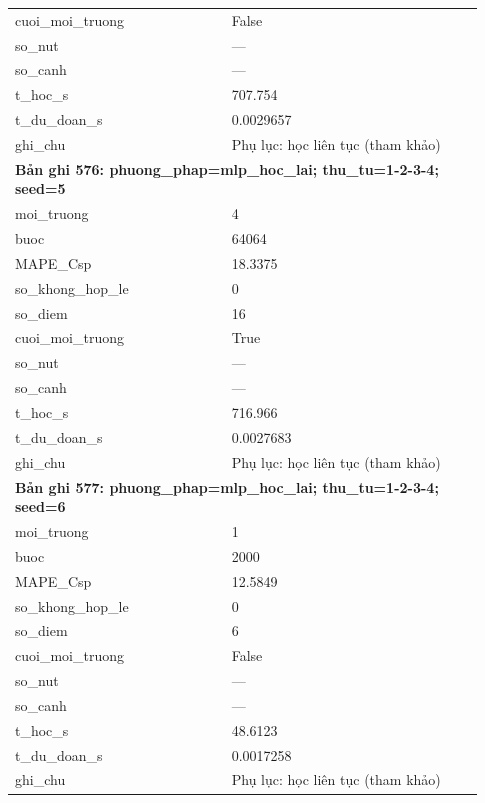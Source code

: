 \begin{longtable}{p{0.43\linewidth}p{0.50\linewidth}}
cuoi\_\allowbreak moi\_\allowbreak truong & False \\
so\_\allowbreak nut & — \\
so\_\allowbreak canh & — \\
t\_\allowbreak hoc\_\allowbreak s & 707.754 \\
t\_\allowbreak du\_\allowbreak doan\_\allowbreak s & 0.0029657 \\
ghi\_\allowbreak chu & Phụ lục: học liên tục (tham khảo) \\
\midrule
\multicolumn{2}{p{0.95\linewidth}}{\textbf{Bản ghi 576: phuong\_phap=mlp\_hoc\_lai; thu\_tu=1-2-3-4; seed=5}} \\
moi\_\allowbreak truong & 4 \\
buoc & 64064 \\
MAPE\_\allowbreak Csp & 18.3375 \\
so\_\allowbreak khong\_\allowbreak hop\_\allowbreak le & 0 \\
so\_\allowbreak diem & 16 \\
cuoi\_\allowbreak moi\_\allowbreak truong & True \\
so\_\allowbreak nut & — \\
so\_\allowbreak canh & — \\
t\_\allowbreak hoc\_\allowbreak s & 716.966 \\
t\_\allowbreak du\_\allowbreak doan\_\allowbreak s & 0.0027683 \\
ghi\_\allowbreak chu & Phụ lục: học liên tục (tham khảo) \\
\midrule
\multicolumn{2}{p{0.95\linewidth}}{\textbf{Bản ghi 577: phuong\_phap=mlp\_hoc\_lai; thu\_tu=1-2-3-4; seed=6}} \\
moi\_\allowbreak truong & 1 \\
buoc & 2000 \\
MAPE\_\allowbreak Csp & 12.5849 \\
so\_\allowbreak khong\_\allowbreak hop\_\allowbreak le & 0 \\
so\_\allowbreak diem & 6 \\
cuoi\_\allowbreak moi\_\allowbreak truong & False \\
so\_\allowbreak nut & — \\
so\_\allowbreak canh & — \\
t\_\allowbreak hoc\_\allowbreak s & 48.6123 \\
t\_\allowbreak du\_\allowbreak doan\_\allowbreak s & 0.0017258 \\
ghi\_\allowbreak chu & Phụ lục: học liên tục (tham khảo) \\

\end{longtable}
